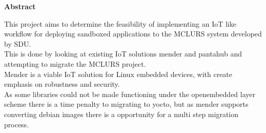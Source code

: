 \documentclass[../../main.tex]{subfiles}
\begin{document}
\begin{center}
	\bf\large Abstract
\end{center}

This project aims to determine the feasibility of implementing an IoT like workflow for deploying
sandboxed applications to the MCLURS system developed by SDU.
\\

This is done by looking at existing IoT solutions mender and pantahub and attempting to migrate
the MCLURS project.
\\

Mender is a viable IoT solution for Linux embedded devices, with create emphasis on robustness
and security.
\\

As some libraries could not be made functioning under the openembedded layer scheme
there  is a time penalty to migrating to yocto, but as mender supports converting debian images
there is a opportunity for a multi step migration process.






	
\end{document}
